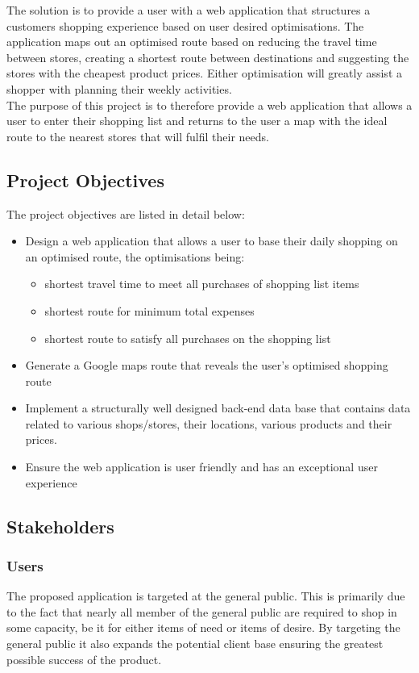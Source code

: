 \documentclass[10pt,twocolumn]{witseiepaper}
\begin{document}
		The solution is to provide a user with a web application that structures a customers shopping experience based on user desired optimisations. The application maps out an optimised route based on reducing the travel time between stores, creating a shortest route between destinations and suggesting the stores with the cheapest product prices. Either optimisation will greatly assist a shopper with planning their weekly activities. \\
		
		The purpose of this project is to therefore provide a web application that allows a user to enter their shopping list and returns to the user a map with the ideal route to the nearest stores that will fulfil their needs. 

	\subsection{Project Objectives}

		The project objectives are listed in detail below:

		\begin{itemize}
			\item Design a web application that allows a user to base their daily shopping on an optimised route, the optimisations being:
			\begin{itemize}
				\item shortest travel time to meet all purchases of shopping list items 
				\item shortest route for minimum total expenses
				\item shortest route to satisfy all purchases on the shopping list 
			\end{itemize}
			\item Generate a Google maps route that reveals the user's optimised shopping route
			\item Implement a structurally well designed back-end data base that contains data related to various shops/stores, their locations, various products and their prices.
			\item Ensure the web application is user friendly and has an exceptional user experience
		\end{itemize}

	\subsection{Stakeholders}
		
		\subsubsection{Users} The proposed application is targeted at the general public. This is primarily due to the fact that nearly all member of the general public are required to shop in some capacity, be it for either items of need or items of desire. By targeting the general public it also expands the potential client base ensuring the greatest possible success of the product.\\
		
\end{document}
